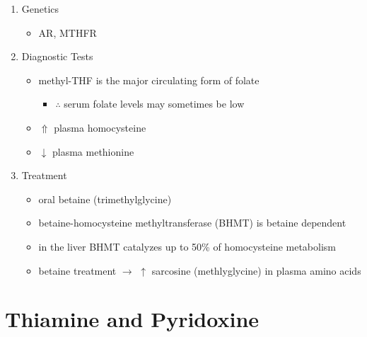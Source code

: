 \documentclass{scrartcl}
\begin{document}
\begin{enumerate}
\item Genetics
\label{sec:orgf886bf8}
\begin{itemize}
\item AR, MTHFR
\end{itemize}

\item Diagnostic Tests
\label{sec:orgb75929c}
\begin{itemize}
\item methyl-THF is the major circulating form of folate
\begin{itemize}
\item \(\therefore\) serum folate levels may sometimes be low
\end{itemize}
\item \(\Uparrow\) plasma homocysteine
\item \(\downarrow\) plasma methionine
\end{itemize}

\item Treatment
\label{sec:orgc60abcf}
\begin{itemize}
\item oral betaine (trimethylglycine)
\item betaine-homocysteine methyltransferase (BHMT) is betaine dependent
\end{itemize}
\begin{itemize}
\item in the liver BHMT catalyzes up to 50\% of homocysteine metabolism
\item betaine treatment \(\to\) \(\uparrow\) sarcosine (methlyglycine) in plasma amino acids
\end{itemize}
\end{enumerate}

\section{Thiamine and Pyridoxine}
\label{sec:orga4f620e}
\end{document}
